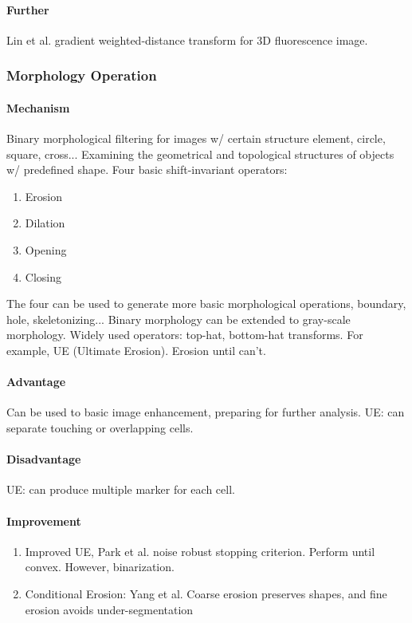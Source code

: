 \documentclass[10pt,a4paper]{article}
\begin{document}
\paragraph{Further}Lin et al. gradient weighted-distance transform for 3D fluorescence image.

\subsubsection{Morphology Operation}
\paragraph{Mechanism}Binary morphological filtering for images w/ certain structure element, circle, square, cross... Examining the geometrical and topological structures of objects w/ predefined shape. Four basic shift-invariant operators:
\begin{enumerate}
	\item Erosion
	\item Dilation
	\item Opening
	\item Closing
\end{enumerate}
The four can be used to generate more basic morphological operations, boundary, hole, skeletonizing... Binary morphology can be extended to gray-scale morphology. Widely used operators: top-hat, bottom-hat transforms. For example, UE (Ultimate Erosion). Erosion until can't.
\paragraph{Advantage}Can be used to basic image enhancement, preparing for further analysis. UE: can separate touching or overlapping cells.
\paragraph{Disadvantage}UE: can produce multiple marker for each cell.
\paragraph{Improvement}
\begin{enumerate}
	\item Improved UE, Park et al. noise robust stopping criterion. Perform until convex. However, binarization.
	\item Conditional Erosion: Yang et al. Coarse erosion preserves shapes, and fine erosion avoids under-segmentation
\end{enumerate}
\end{document}
